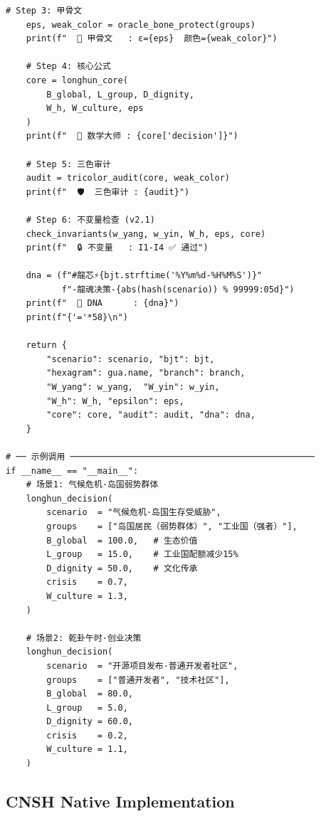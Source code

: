 \documentclass[conference]{IEEEtran}
\begin{document}
\begin{lstlisting}[style=python,
  caption={LongHun Dynamic Weight Algorithm --- Python v2.1},
  label={lst:python}]
    # Step 3: 甲骨文
    eps, weak_color = oracle_bone_protect(groups)
    print(f"  🧬 甲骨文   : ε={eps}  颜色={weak_color}")

    # Step 4: 核心公式
    core = longhun_core(
        B_global, L_group, D_dignity,
        W_h, W_culture, eps
    )
    print(f"  📐 数学大师 : {core['decision']}")

    # Step 5: 三色审计
    audit = tricolor_audit(core, weak_color)
    print(f"  🛡️  三色审计 : {audit}")

    # Step 6: 不变量检查 (v2.1)
    check_invariants(w_yang, w_yin, W_h, eps, core)
    print(f"  🔒 不变量   : I1-I4 ✅ 通过")

    dna = (f"#龍芯⚡️{bjt.strftime('%Y%m%d-%H%M%S')}"
           f"-龍魂决策-{abs(hash(scenario)) % 99999:05d}")
    print(f"  🔑 DNA      : {dna}")
    print(f"{'='*58}\n")

    return {
        "scenario": scenario, "bjt": bjt,
        "hexagram": gua.name, "branch": branch,
        "W_yang": w_yang,  "W_yin": w_yin,
        "W_h": W_h, "epsilon": eps,
        "core": core, "audit": audit, "dna": dna,
    }

# ── 示例调用 ────────────────────────────────────────────────
if __name__ == "__main__":
    # 场景1: 气候危机·岛国弱势群体
    longhun_decision(
        scenario  = "气候危机·岛国生存受威胁",
        groups    = ["岛国居民（弱势群体）", "工业国（强者）"],
        B_global  = 100.0,   # 生态价值
        L_group   = 15.0,    # 工业国配额减少15%
        D_dignity = 50.0,    # 文化传承
        crisis    = 0.7,
        W_culture = 1.3,
    )

    # 场景2: 乾卦午时·创业决策
    longhun_decision(
        scenario  = "开源项目发布·普通开发者社区",
        groups    = ["普通开发者", "技术社区"],
        B_global  = 80.0,
        L_group   = 5.0,
        D_dignity = 60.0,
        crisis    = 0.2,
        W_culture = 1.1,
    )
\end{lstlisting}

\subsection{CNSH Native Implementation}
\end{document}
